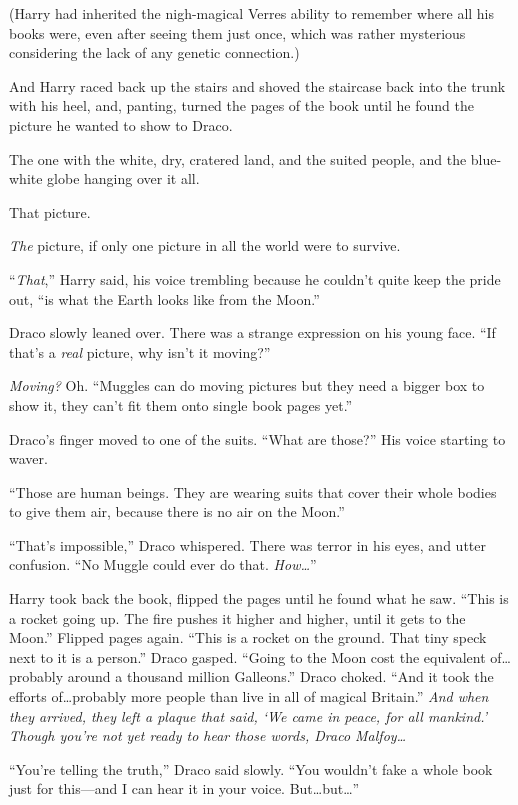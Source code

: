 (Harry had inherited the nigh-magical Verres ability to remember where all his books were, even after seeing them just once, which was rather mysterious considering the lack of any genetic connection.)

And Harry raced back up the stairs and shoved the staircase back into the trunk with his heel, and, panting, turned the pages of the book until he found the picture he wanted to show to Draco.

The one with the white, dry, cratered land, and the suited people, and the blue-white globe hanging over it all.

That picture.

\emph{The} picture, if only one picture in all the world were to survive.

“\emph{That},” Harry said, his voice trembling because he couldn’t quite keep the pride out, “is what the Earth looks like from the Moon.”

Draco slowly leaned over. There was a strange expression on his young face. “If that’s a \emph{real} picture, why isn’t it moving?”

\emph{Moving?} Oh. “Muggles can do moving pictures but they need a bigger box to show it, they can’t fit them onto single book pages yet.”

Draco’s finger moved to one of the suits. “What are those?” His voice starting to waver.

“Those are human beings. They are wearing suits that cover their whole bodies to give them air, because there is no air on the Moon.”

“That’s impossible,” Draco whispered. There was terror in his eyes, and utter confusion. “No Muggle could ever do that. \emph{How…}”

Harry took back the book, flipped the pages until he found what he saw. “This is a rocket going up. The fire pushes it higher and higher, until it gets to the Moon.” Flipped pages again. “This is a rocket on the ground. That tiny speck next to it is a person.” Draco gasped. “Going to the Moon cost the equivalent of…probably around a thousand million Galleons.” Draco choked. “And it took the efforts of…probably more people than live in all of magical Britain.” \emph{And when they arrived, they left a plaque that said, ‘We came in peace, for all mankind.’ Though you’re not yet ready to hear those words, Draco Malfoy…}

“You’re telling the truth,” Draco said slowly. “You wouldn’t fake a whole book just for this—and I can hear it in your voice. But…but…”

